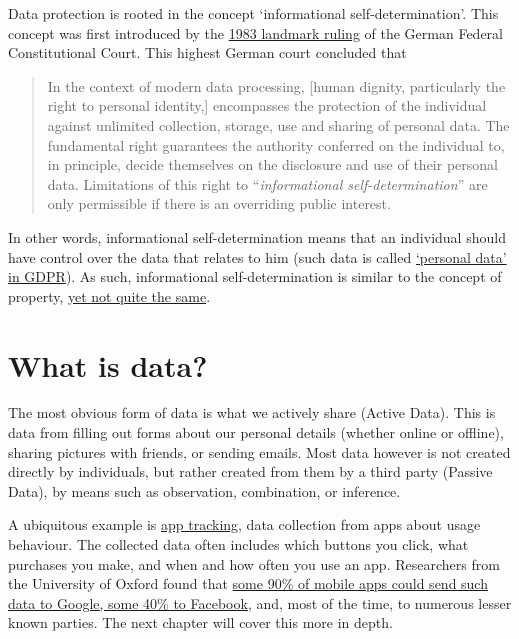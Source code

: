 \documentclass[
]{book}
\begin{document}
Data protection is rooted in the concept `informational self-determination'. This concept was first introduced by the \href{https://www.bundesverfassungsgericht.de/SharedDocs/Entscheidungen/EN/1983/12/rs19831215_1bvr020983en.html}{1983 landmark ruling} of the German Federal Constitutional Court. This highest German court concluded that

\begin{quote}
In the context of modern data processing, {[}human dignity, particularly the right to personal identity,{]} encompasses the protection of the individual against unlimited collection, storage, use and sharing of personal data. The fundamental right guarantees the authority conferred on the individual to, in principle, decide themselves on the disclosure and use of their personal data. Limitations of this right to ``\emph{informational self-determination}'' are only permissible if there is an overriding public interest.
\end{quote}

In other words, informational self-determination means that an individual should have control over the data that relates to him (such data is called \href{https://gdpr-info.eu/art-4-gdpr/}{`personal data' in GDPR}). As such, informational self-determination is similar to the concept of property, \href{https://leidenlawblog.nl/articles/privacy-and-property-do-you-really-own-your-personal-data}{yet not quite the same}.

\hypertarget{what-is-data}{%
\section{What is data?}\label{what-is-data}}

The most obvious form of data is what we actively share (Active Data). This is data from filling out forms about our personal details (whether online or offline), sharing pictures with friends, or sending emails. Most data however is not created directly by individuals, but rather created from them by a third party (Passive Data), by means such as observation, combination, or inference.

A ubiquitous example is \href{https://en.ryte.com/wiki/App_Tracking}{app tracking}, data collection from apps about usage behaviour. The collected data often includes which buttons you click, what purchases you make, and when and how often you use an app. Researchers from the University of Oxford found that \href{https://arxiv.org/pdf/1804.03603.pdf}{some 90\% of mobile apps could send such data to Google, some 40\% to Facebook}, and, most of the time, to numerous lesser known parties. The next chapter will cover this more in depth.
\end{document}
